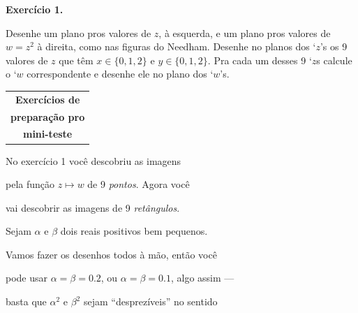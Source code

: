 \documentclass[oneside,12pt]{article}
\begin{document}




\newpage


{\bf Exercício 1.}

Desenhe um plano pros valores de $z$, à esquerda, e um plano pros
valores de $w=z^2$ à direita, como nas figuras do Needham. Desenhe no
planos dos `$z$'s os 9 valores de $z$ que têm $x∈\{0,1,2\}$ e
$y∈\{0,1,2\}$. Pra cada um desses 9 `$z$s calcule o `$w$
correspondente e desenhe ele no plano dos `$w$'s.


\newpage


\thispagestyle{empty}

\begin{center}

\vspace*{1.5cm}

\begin{tabular}{c}
{\bf \Large Exercícios de} \\
{\bf \Large preparação pro} \\
{\bf \Large mini-teste} \\
\end{tabular}

\end{center}

\newpage

No exercício 1 você descobriu as imagens

pela função $z \mapsto w$ de 9 {\sl pontos}. Agora você

vai descobrir as imagens de 9 {\sl retângulos}.

\msk

Sejam $α$ e $β$ dois reais positivos bem pequenos.

Vamos fazer os desenhos todos à mão, então você

pode usar $α=β=0.2$, ou $α=β=0.1$, algo assim ---

basta que $α^2$ e $β^2$ sejam ``desprezíveis'' no sentido
\end{document}
